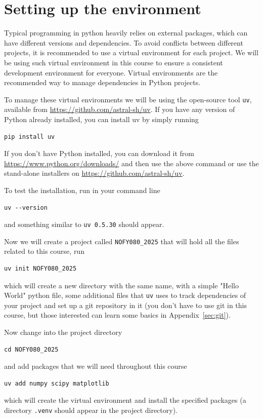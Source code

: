 \newpage
\section{Setting up the environment}
Typical programming in python heavily relies on external packages, which can have different versions and dependencies. To avoid conflicts between different projects, it is recommended to use a virtual environment for each project. We will be using such virtual environment in this course to ensure a consistent development environment for everyone. Virtual environments are the recommended way to manage dependencies in Python projects.

To manage these virtual environments we will be using the open-source tool \verb|uv|, available from \url{https://github.com/astral-sh/uv}. If you have any version of Python already installed, you can install uv by simply running
\begin{lstlisting}
pip install uv
\end{lstlisting}
If you don't have Python installed, you can download it from \url{https://www.python.org/downloads/} and then use the above command or use the stand-alone installers on \url{https://github.com/astral-sh/uv}.

To test the installation, run in your command line
\begin{lstlisting}
uv --version
\end{lstlisting}
and something similar to \verb|uv 0.5.30| should appear.

Now we will create a project called \verb|NOFY080_2025| that will hold all the files related to this course, run
\begin{lstlisting}
uv init NOFY080_2025
\end{lstlisting}
which will create a new directory with the same name, with a simple "Hello World" python file, some additional files that \verb|uv| uses to track dependencies of your project and set up a git repository in it (you don't have to use git in this course, but those interested can learn some basics in Appendix~\ref{sec:git}).

Now change into the project directory
\begin{lstlisting}
cd NOFY080_2025
\end{lstlisting}
and add packages that we will need throughout this course
\begin{lstlisting}
uv add numpy scipy matplotlib
\end{lstlisting}
which will create the virtual environment and install the specified packages (a directory \verb|.venv| should appear in the project directory).

